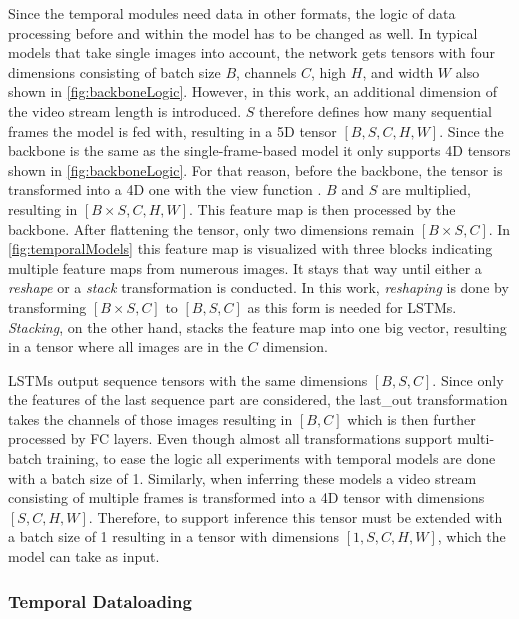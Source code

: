 Since the temporal modules need data in other formats, the logic of data processing before and within the model has to be changed as well.
In typical models that take single images into account, the network gets tensors with four dimensions consisting of batch size $B$, channels $C$, high $H$, and width $W$ also shown in \autoref{fig:backboneLogic}.
However, in this work, an additional dimension of the video stream length is introduced.
$S$ therefore defines how many sequential frames the model is fed with, resulting in a 5D tensor $[B, S, C, H, W]$.
Since the backbone is the same as the single-frame-based model it only supports 4D tensors shown in \autoref{fig:backboneLogic}.
For that reason, before the backbone, the tensor is transformed into a 4D one with the view function \cite{pytorch_view_docu}.
$B$ and $S$ are multiplied, resulting in $[B \times S, C, H, W]$.
This feature map is then processed by the backbone.
After flattening the tensor, only two dimensions remain $[B \times S, C]$.
In \autoref{fig:temporalModels} this feature map is visualized with three blocks indicating multiple feature maps from numerous images.
It stays that way until either a \textit{reshape} or a \textit{stack} transformation is conducted.
In this work, \textit{reshaping} is done by transforming $[B \times S, C]$ to $[B, S, C]$ as this form is needed for LSTMs.
\textit{Stacking}, on the other hand, stacks the feature map into one big vector, resulting in a tensor where all images are in the $C$ dimension. 

LSTMs output sequence tensors with the same dimensions $[B, S, C]$.
Since only the features of the last sequence part are considered, the last\_out transformation takes the channels of those images resulting in $[B, C]$ which is then further processed by \ac{FC} layers.
Even though almost all transformations support multi-batch training, to ease the logic all experiments with temporal models are done with a batch size of 1.
Similarly, when inferring these models a video stream consisting of multiple frames is transformed into a 4D tensor with dimensions $[S, C, H, W]$.
Therefore, to support inference this tensor must be extended with a batch size of 1 resulting in a tensor with dimensions $[1, S, C, H, W]$, which the model can take as input.

\subsubsection{Temporal Dataloading}

